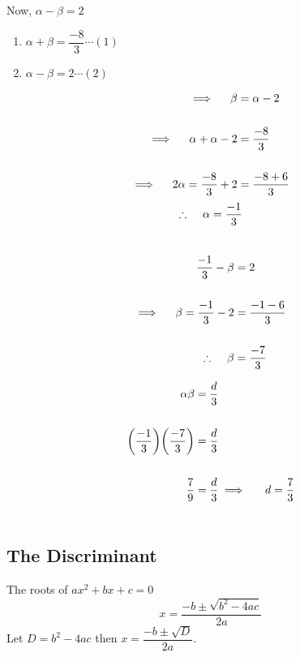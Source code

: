 \documentclass[11pt,a4paper]{article}
\begin{document}
Now, $\alpha - \beta = 2$
\begin{enumerate}
\item[] $\alpha +\beta=\dfrac{-8}{3}\cdots (1)$\\

\item[]$\alpha -\beta = 2\cdots (2)$\\
\end{enumerate}


\begin{align*}
\implies\hspace{0.4cm} \beta & = \alpha -2\\\\
\implies \hspace{0.4cm} \alpha+\alpha-2 & = \frac{-8}{3}\\\\
\implies \hspace{0.4cm} 2\alpha  = \frac{-8}{3}+2 & =\frac{-8+6}{3}\\
\end{align*}
$$\therefore \hspace{0.4cm} \alpha=\frac{-1}{3}$$\\


\begin{align*}
\frac{-1}{3}-\beta &=2\\\\
\implies \hspace{0.4cm} \beta =\frac{-1}{3}-2 & = \frac{-1-6}{3}\\\\
\therefore \hspace{0.4cm} \beta &=\frac{-7}{3}\\ 
\end{align*}

\begin{align*}
\alpha \beta & = \frac{d}{3}\\\\
\bigg(\frac{-1}{3}\bigg)\bigg(\frac{-7}{3}\bigg) & = \dfrac{d}{3}\\\\
\frac{7}{9} & = \frac{d}{3}
\implies \hspace{0.5cm} d=\frac{7}{3}\\\\
\end{align*}








\subsection{The Discriminant}
The roots of $ax^2+bx+c=0$ $$x=\frac{-b\pm \sqrt{b^2-4ac}}{2a}$$
Let $D=b^2-4ac$ then $x=\dfrac{-b\pm \sqrt{D}}{2a}$.\\
\end{document}
